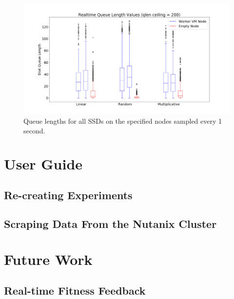 \documentclass[12pt]{article}
\begin{document}
  \begin{figure}[!htb]
    \centering
    \includegraphics[scale=0.30]{images/qlen_200_box.png} 
    \caption{Queue lengths for all SSDs on the specified nodes sampled every 1
             second.}
    \label{fig:qlen_200}
  \end{figure}

\section{User Guide}

  \subsection{Re-creating Experiments}


  \subsection{Scraping Data From the Nutanix Cluster}

\section{Future Work}


  \subsection{Real-time Fitness Feedback}

  
\end{document}
